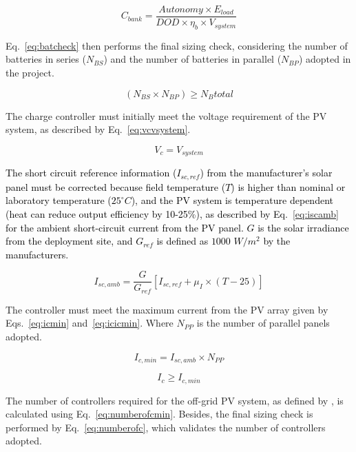 \documentclass[10pt,journal,compsoc]{IEEEtran}
\begin{document}
\begin{equation}
\label{eq:Cbank}
C_{bank} = \dfrac{Autonomy \times E_{load}}{DOD \times \eta_{b} \times V_{system}}
\end{equation}

Eq.~\ref{eq:batcheck} then performs the final sizing check, considering the number of batteries in series ($ N_{BS} $) and the number of batteries in parallel ($ N_{BP} $) adopted in the project.

\begin{equation}
\label{eq:batcheck}
\left( N_{BS} \times N_{BP} \right) \geq N_{B}total
\end{equation}

The charge controller must initially meet the voltage requirement of the PV system, as described by Eq.~\eqref{eq:vcvsystem}.
 
\begin{equation}
\label{eq:vcvsystem}
V_{c} = V_{system}
\end{equation}

\textcolor{black}{The short circuit reference information ($I_{sc,ref}$) from the manufacturer's solar panel must be corrected because field temperature ($T$) is higher than nominal or laboratory temperature ($25^{\circ}C$), and the PV system is temperature dependent (heat can reduce output efficiency by 10-25\%), as described by Eq.~\eqref{eq:iscamb} for the ambient short-circuit current from the PV panel. $G$ is the solar irradiance from the deployment site, and $G_{ref}$ is defined as $1000$ $W/m^{2}$ by the manufacturers.}

\begin{equation}
\label{eq:iscamb}
I_{sc,amb} = \dfrac{G}{G_{ref}} \left[ I_{sc,ref} + \mu_{I} \times (T-25) \right] 
\end{equation}

The controller must meet the maximum current from the PV array given by Eqs.~\eqref{eq:icmin} and~\eqref{eq:icicmin}. Where $N_{PP}$ is the number of parallel panels adopted.

\begin{equation}
\label{eq:icmin}
I_{c,min} = I_{sc,amb} \times N_{PP}
\end{equation}

\begin{equation}
\label{eq:icicmin}
I_{c} \geq I_{c,min}
\end{equation}

The number of controllers required for the off-grid PV system, as defined by \cite{Yatimi}, is calculated using Eq.~\eqref{eq:numberofcmin}. Besides, the final sizing check is performed by Eq.~\eqref{eq:numberofc}, which validates the number of controllers adopted.
\end{document}
